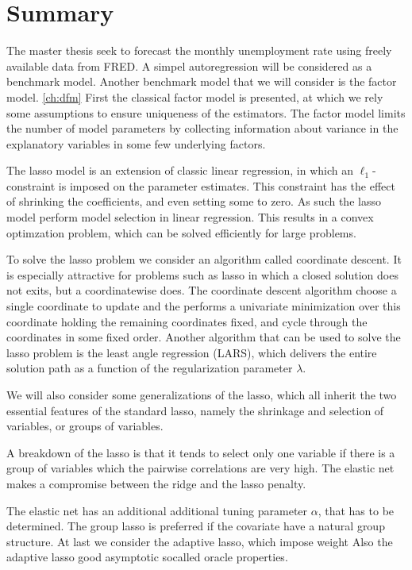 \chapter{Summary}
%
The master thesis seek to forecast the monthly unemployment rate using freely available data from FRED.
A simpel autoregression will be considered as a benchmark model.
Another benchmark model that we will consider is the factor model.  \ref{ch:dfm}
First the classical factor model is presented, at which we rely some assumptions to ensure uniqueness of the estimators.
The factor model limits the number of model parameters by collecting information about variance in the explanatory variables in some few underlying factors.

The lasso model is an extension of classic linear regression, in which an \(\ell_1\)-constraint is imposed on the parameter estimates.
This constraint has the effect of shrinking the coefficients, and even setting some to zero.
As such the lasso model perform model selection in linear regression.
This results in a convex optimzation problem, which can be solved efficiently for large problems.

To solve the lasso problem we consider an algorithm called coordinate descent.
It is especially attractive for problems such as lasso in which a closed solution does not exits, but a coordinatewise does.
The coordinate descent algorithm choose a single coordinate to update and the performs a univariate minimization over this coordinate holding the remaining coordinates fixed, and cycle through the coordinates in some fixed order.
Another algorithm that can be used to solve the lasso problem is the least angle regression (LARS), which delivers the entire solution path as a function of the regularization parameter \(\lambda\).

We will also consider some generalizations of the lasso, which all inherit the two essential features of the standard lasso, namely the shrinkage and selection of variables, or groups of variables.

A breakdown of the lasso is that it tends to select only one variable if there is a group of variables which the pairwise correlations are very high.
The elastic net makes a compromise between the ridge and the lasso penalty. 

The elastic net has an additional additional tuning parameter \(\alpha\), that has to be determined.
The group lasso is preferred if the covariate have a natural group structure.
At last we consider the adaptive lasso, which impose weight
Also the adaptive lasso good asymptotic 
socalled oracle properties.



